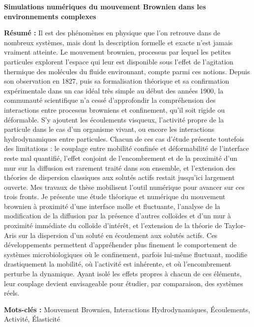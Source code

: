 \documentclass[french,12pt,a4paper]{report}
\begin{document}
\thispagestyle{empty}
\vspace*{0pt}
\vfill
\begin{small}
\begin{center}
\textbf{Simulations numériques du mouvement Brownien dans les environnements complexes}
\end{center}    
\textbf{Résumé :} 
Il est des phénomènes en physique que l'on retrouve dans de nombreux systèmes, mais dont la description formelle et exacte n'est jamais vraiment atteinte. Le mouvement brownien, processus par lequel les petites particules explorent l'espace qui leur est disponible sous l'effet de l'agitation thermique des molécules du fluide environnant, compte parmi ces notions. Depuis son observation en 1827, puis sa formalisation théorique et sa confirmation expérimentale dans un cas idéal très simple au début des années 1900, la communauté scientifique n'a cessé d'approfondir la compréhension des interactions entre processus browniens et confinement, qu'il soit rigide ou déformable. S'y ajoutent les écoulements visqueux, l'activité propre de la particule dans le cas d'un organisme vivant, ou encore les interactions hydrodynamiques entre particules. Chacun de ces cas d'étude présente toutefois des limitations : le couplage entre mobilité confinée et déformabilité de l'interface reste mal quantifié, l'effet conjoint de l'encombrement et de la proximité d'un mur sur la diffusion est rarement traité dans son ensemble, et l'extension des théories de dispersion classiques aux solutés actifs restait jusqu'ici largement ouverte.
Mes travaux de thèse mobilisent l'outil numérique pour avancer sur ces trois fronts. Je présente une étude théorique et numérique du mouvement brownien à proximité d'une interface molle et fluctuante, l'analyse de la modification de la diffusion par la présence d'autres colloïdes et d'un mur à proximité immédiate du colloïde d'intérêt, et l'extension de la théorie de Taylor-Aris sur la dispersion d'un soluté en écoulement aux solutés actifs. Ces développements permettent d'appréhender plus finement le comportement de systèmes microbiologiques où le confinement, parfois lui-même fluctuant, modifie drastiquement la mobilité, où l'activité est inhérente, et où l'encombrement perturbe la dynamique. Ayant isolé les effets propres à chacun de ces éléments, leur couplage devient envisageable pour étudier, par comparaison, des systèmes réels. 




\textbf{Mots-clés :} Mouvement Brownien, Interactions Hydrodynamiques, Écoulements, Activité, Élasticité\\
\noindent\makebox[\linewidth]{\rule{\textwidth}{0.4pt}}


\end{small}
\end{document}
